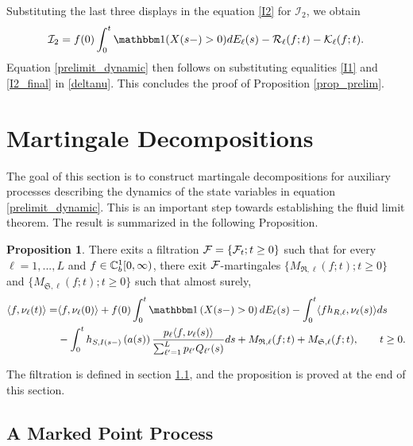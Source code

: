 \documentclass{article}
\theoremstyle{definition}
\newtheorem{proposition}[theorem]{Proposition}
\numberwithin{equation}{section}
\begin{document}
Substituting the last three displays in the equation \eqref{I2} for $\mathcal{I}_2$, we obtain
\begin{equation}\label{I2_final}
\mathcal{I}_2=f(0)\int_0^t\indicil{X(s-)>0} d \arrival_{\ell}(s)-\renegC_\ell(f;t)-\entryC_\ell(f;t).
\end{equation}
Equation \eqref{prelimit_dynamic} then follows on substituting equalities \eqref{I1} and \eqref{I2_final} in \eqref{deltanu}. This concludes the proof of Proposition \ref{prop_prelim}.






\section{Martingale Decompositions}\label{sec_mgale}

The goal of this section is to construct martingale decompositions for auxiliary processes describing the dynamics of the state variables in equation \eqref{prelimit_dynamic}. This is an important step towards establishing the fluid limit theorem. The result is summarized in the following Proposition.

\begin{proposition}\label{prop_dynamic}
  There exits a filtration $\mathcal{F}=\{\mathcal{F}_t;t\geq0\}$ such that for every $\ell=1,...,L$ and $f\in\mathbb{C}_b^{1}[0,\infty)$, there exit  $\mathcal{F}$-martingales $\{M_{\mathfrak{R},\ell}(f;t);t\geq0\}$ and $\{M_{\mathfrak{S},\ell}(f;t);t\geq0\}$ such that almost surely,
  \begin{align}\label{dynamic_final}
    \langle f,\nu_\ell(t) \rangle = & \langle f,\nu_\ell(0)\rangle + f(0)\int_0^t \indic{X(s-)>0} d \arrival_\ell(s) - \int_0^t \langle fh_{R,\ell},\nu_\ell(s)\rangle ds \notag\\
    & - \int_0^t h_{S,\class(s-)}\left(\age(s)\right)\frac{\weight_\ell \langle f,\nu_\ell(s)\rangle }{\sum_{\ell'=1}^L\weight_{\ell'}\ql_{\ell'}(s)} ds + M_{\mathfrak{R},\ell}(f;t)+M_{\mathfrak{S},\ell}(f;t),\quad\quad t\geq0.
  \end{align}
\end{proposition}
The filtration is defined in section \ref{sec_MPP}, and the proposition is proved at the end of this section.

\subsection{A Marked Point Process}\label{sec_MPP}
\end{document}
